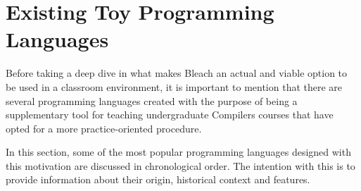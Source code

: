 \section{Existing Toy Programming Languages}

Before taking a deep dive in what makes Bleach an actual and viable option to be used in a classroom environment, it is important to mention that there are several programming languages created with the purpose of being a supplementary tool for teaching undergraduate Compilers courses that have opted for a more practice-oriented procedure.

In this section, some of the most popular programming languages designed with this motivation are discussed in chronological order. The intention with this is to provide information about their origin, historical context and features.

